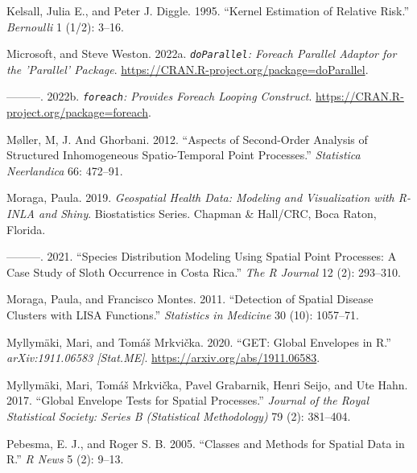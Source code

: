 \begin{CSLReferences}{1}{0}
\leavevmode{}%
Kelsall, Julia E., and Peter J. Diggle. 1995. {``Kernel Estimation of Relative Risk.''} \emph{Bernoulli} 1 (1/2): 3--16.

\leavevmode{}%
Microsoft, and Steve Weston. 2022a. \emph{\texttt{doParallel}: Foreach Parallel Adaptor for the 'Parallel' Package}. \url{https://CRAN.R-project.org/package=doParallel}.

\leavevmode{}%
---------. 2022b. \emph{\texttt{foreach}: Provides Foreach Looping Construct}. \url{https://CRAN.R-project.org/package=foreach}.

\leavevmode{}%
Møller, M, J. And Ghorbani. 2012. {``Aspects of Second-Order Analysis of Structured Inhomogeneous Spatio-Temporal Point Processes.''} \emph{Statistica Neerlandica} 66: 472--91.

\leavevmode{}%
Moraga, Paula. 2019. \emph{Geospatial Health Data: Modeling and Visualization with {R-INLA} and Shiny}. Biostatistics Series. Chapman \& Hall/CRC, Boca Raton, Florida.

\leavevmode{}%
---------. 2021. {``Species Distribution Modeling Using Spatial Point Processes: A Case Study of Sloth Occurrence in {C}osta {R}ica.''} \emph{The {R} Journal} 12 (2): 293--310.

\leavevmode{}%
Moraga, Paula, and Francisco Montes. 2011. {``Detection of Spatial Disease Clusters with LISA Functions.''} \emph{Statistics in Medicine} 30 (10): 1057--71.

\leavevmode{}%
Myllymäki, Mari, and Tomáš Mrkvička. 2020. {``{GET}: Global Envelopes in {R}.''} \emph{arXiv:1911.06583 {[}Stat.ME{]}}. \url{https://arxiv.org/abs/1911.06583}.

\leavevmode{}%
Myllymäki, Mari, Tomáš Mrkvička, Pavel Grabarnik, Henri Seijo, and Ute Hahn. 2017. {``Global Envelope Tests for Spatial Processes.''} \emph{Journal of the Royal Statistical Society: Series B (Statistical Methodology)} 79 (2): 381--404.

\leavevmode{}%
Pebesma, E. J., and Roger S. B. 2005. {``Classes and Methods for Spatial Data in {R}.''} \emph{R News} 5 (2): 9--13.


\end{CSLReferences}
